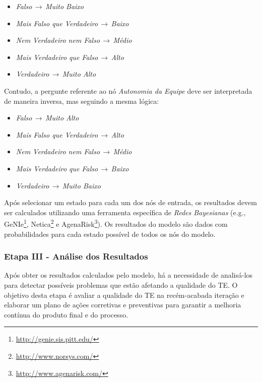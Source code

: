\begin{itemize}
  \item \textit{Falso}$\,\to\,$\textit{Muito Baixo}
  \item \textit{Mais Falso que Verdadeiro}$\,\to\,$\textit{Baixo}
  \item \textit{Nem Verdadeiro nem Falso}$\,\to\,$\textit{Médio}
  \item \textit{Mais Verdadeiro que Falso}$\,\to\,$\textit{Alto}
  \item \textit{Verdadeiro}$\,\to\,$\textit{Muito Alto}
\end{itemize}

Contudo, a pergunte referente ao nó \textit{Autonomia da Equipe} deve ser interpretada de maneira inversa, mas seguindo a mesma lógica:

\begin{itemize}
  \item \textit{Falso}$\,\to\,$\textit{Muito Alto}
  \item \textit{Mais Falso que Verdadeiro}$\,\to\,$\textit{Alto}
  \item \textit{Nem Verdadeiro nem Falso}$\,\to\,$\textit{Médio}
  \item \textit{Mais Verdadeiro que Falso}$\,\to\,$\textit{Baixo}
  \item \textit{Verdadeiro}$\,\to\,$\textit{Muito Baixo}
\end{itemize}

Após selecionar um estado para cada um dos nós de entrada, os resultados devem ser calculados utilizando uma ferramenta específica de \textit{Redes Bayesianas} (e.g., GeNIe\footnote{\url{http://genie.sis.pitt.edu/}}, Netica\footnote{\url{http://www.norsys.com/}} e AgenaRisk\footnote{\url{http://www.agenarisk.com/}}). Os resultados do modelo são dados com probabilidades para cada estado possível de todos os nós do modelo.

\subsubsection{Etapa III - Análise dos Resultados}
\label{descricao:analise}

Após obter os resultados calculados pelo modelo, há a necessidade de analisá-los para detectar possíveis problemas que estão afetando a qualidade do TE. O objetivo desta etapa é avaliar a qualidade do TE na recém-acabada iteração e elaborar um plano de ações corretivas e preventivas para garantir a melhoria contínua do produto final e do processo.


